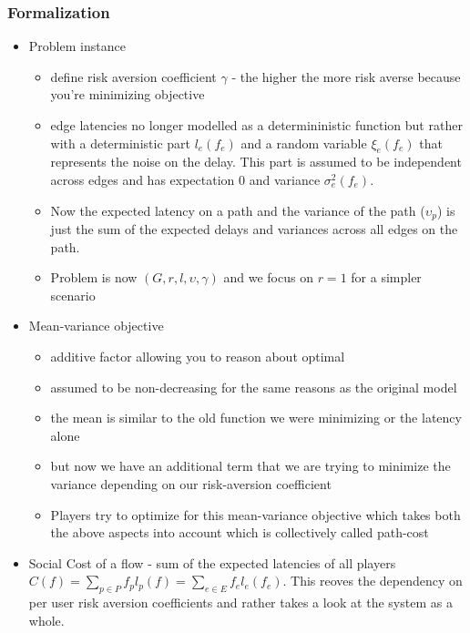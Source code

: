 \subsubsection{Formalization}
\begin{itemize}
\item Problem instance
    \begin{itemize}
        \item define risk aversion coefficient $\gamma$ - the higher the more risk averse because you're minimizing objective
        \item edge latencies no longer modelled as a determininistic function but rather with a deterministic part $l_e(f_e)$ and
            a random variable $\xi_e(f_e)$ that represents the noise on the delay. This part is assumed to be independent across edges and has expectation
            $0$ and variance $\sigma^2_e(f_e)$.
        \item Now the expected latency on a path and the variance of the path ($\upsilon_p$) is just the sum of the expected delays and variances across all edges
            on the path.
        \item Problem is now $(G,r,l,\upsilon,\gamma)$ and we focus on $r = 1$ for a simpler scenario

    \end{itemize}
\item Mean-variance objective 
    \begin{itemize}
        \item additive factor allowing you to reason about optimal
        \item assumed to be non-decreasing for the same reasons as the original model
        \item the mean is similar to the old function we were minimizing or the latency alone 
        \item but now we have an additional term that we are trying to minimize the variance depending on our risk-aversion coefficient
        \item Players try to optimize for this mean-variance objective which takes both the above aspects into account which is collectively called path-cost
    \end{itemize}

\item Social Cost of a flow - sum of the expected latencies of all players $C(f) = \displaystyle \sum_{p \in P} f_pl_p(f) = 
    \sum_{e \in E}f_el_e(f_e)$. This reoves the dependency on per user risk aversion coefficients and rather takes a look at the system as a whole.


\end{itemize}
